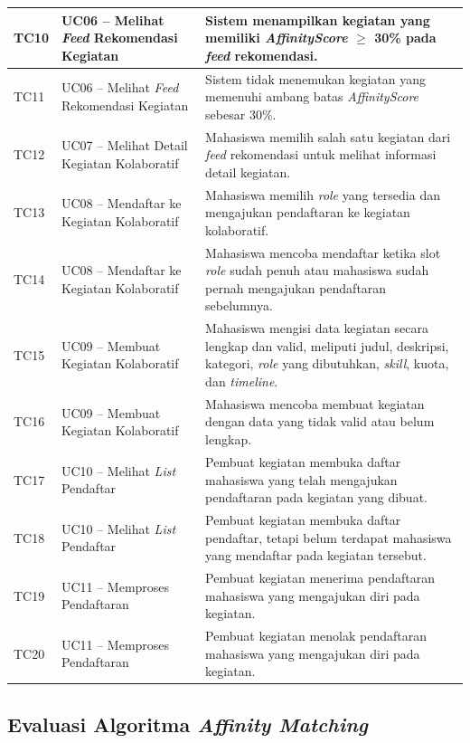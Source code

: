 \begin{longtable}{p{1.5cm} p{5cm} >{\raggedright\arraybackslash}p{\dimexpr\linewidth-6.5cm-6\tabcolsep\relax}}
  \midrule
  TC10 & UC06 -- Melihat \emph{Feed} Rekomendasi Kegiatan & Sistem menampilkan kegiatan yang memiliki \emph{AffinityScore} $\geq$ 30\% pada \emph{feed} rekomendasi. \\
  \midrule
  TC11 & UC06 -- Melihat \emph{Feed} Rekomendasi Kegiatan & Sistem tidak menemukan kegiatan yang memenuhi ambang batas \emph{AffinityScore} sebesar 30\%. \\
  \midrule
  TC12 & UC07 -- Melihat Detail Kegiatan Kolaboratif & Mahasiswa memilih salah satu kegiatan dari \emph{feed} rekomendasi untuk melihat informasi detail kegiatan. \\
  \midrule
  TC13 & UC08 -- Mendaftar ke Kegiatan Kolaboratif & Mahasiswa memilih \emph{role} yang tersedia dan mengajukan pendaftaran ke kegiatan kolaboratif. \\
  \midrule
  TC14 & UC08 -- Mendaftar ke Kegiatan Kolaboratif & Mahasiswa mencoba mendaftar ketika slot \emph{role} sudah penuh atau mahasiswa sudah pernah mengajukan pendaftaran sebelumnya. \\
  \midrule
  TC15 & UC09 -- Membuat Kegiatan Kolaboratif & Mahasiswa mengisi data kegiatan secara lengkap dan valid, meliputi judul, deskripsi, kategori, \emph{role} yang dibutuhkan, \emph{skill}, kuota, dan \emph{timeline}. \\
  \midrule
  TC16 & UC09 -- Membuat Kegiatan Kolaboratif & Mahasiswa mencoba membuat kegiatan dengan data yang tidak valid atau belum lengkap. \\
  \midrule
  TC17 & UC10 -- Melihat \emph{List} Pendaftar & Pembuat kegiatan membuka daftar mahasiswa yang telah mengajukan pendaftaran pada kegiatan yang dibuat. \\
  \midrule
  TC18 & UC10 -- Melihat \emph{List} Pendaftar & Pembuat kegiatan membuka daftar pendaftar, tetapi belum terdapat mahasiswa yang mendaftar pada kegiatan tersebut. \\
  \midrule
  TC19 & UC11 -- Memproses Pendaftaran & Pembuat kegiatan menerima pendaftaran mahasiswa yang mengajukan diri pada kegiatan. \\
  \midrule
  TC20 & UC11 -- Memproses Pendaftaran & Pembuat kegiatan menolak pendaftaran mahasiswa yang mengajukan diri pada kegiatan. \\
\end{longtable}

\subsection{Evaluasi Algoritma \emph{Affinity Matching}}
\label{subsec:eval-algoritma}

